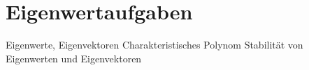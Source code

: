 \appendix

\section{Eigenwertaufgaben}
Eigenwerte, Eigenvektoren
Charakteristisches Polynom
Stabilität von Eigenwerten und Eigenvektoren
